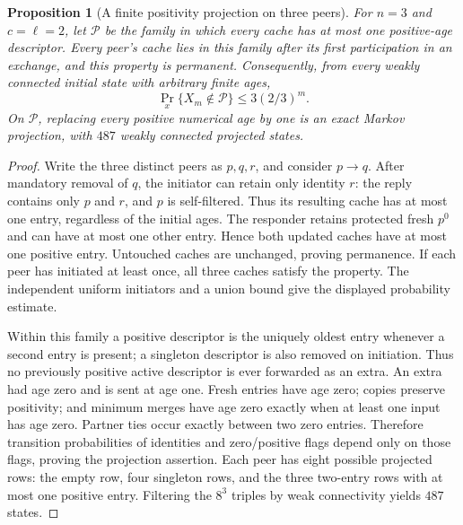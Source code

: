 \documentclass[11pt]{article}
\newtheorem{proposition}[theorem]{Proposition}
\begin{document}
\begin{proposition}[A finite positivity projection on three peers]
\label{prop:c2threepositivity}
For $n=3$ and $c=\ell=2$, let $\mathcal P$ be the family in
which every cache has at most one positive-age descriptor.
Every peer's cache lies in this family after its first
participation in an exchange, and this property is permanent.
Consequently, from every weakly connected initial state with
arbitrary finite ages,
\[
 \Pr_x\{X_m\notin\mathcal P\}\le3(2/3)^m.
\]
On $\mathcal P$, replacing every positive numerical age by one
is an exact Markov projection, with $487$ weakly connected
projected states.
\end{proposition}
\begin{proof}
Write the three distinct peers as $p,q,r$, and consider
$p\to q$. After mandatory removal of $q$, the initiator can
retain only identity $r$: the reply contains only $p$ and $r$,
and $p$ is self-filtered. Thus its resulting cache has at most
one entry, regardless of the initial ages. The responder
retains protected fresh $p^0$ and can have at most one other
entry. Hence both updated caches have at most one positive
entry. Untouched caches are unchanged, proving permanence.
If each peer has initiated at least once, all three caches
satisfy the property. The independent uniform initiators and
a union bound give the displayed probability estimate.

Within this family a positive descriptor is the uniquely
oldest entry whenever a second entry is present; a singleton
descriptor is also removed on initiation. Thus no previously
positive active descriptor is ever forwarded as an extra.
An extra had age zero and is sent at age one. Fresh entries
have age zero; copies preserve positivity; and minimum merges
have age zero exactly when at least one input has age zero.
Partner ties occur exactly between two zero entries.
Therefore transition probabilities of identities and
zero/positive flags depend only on those flags, proving the
projection assertion. Each peer has eight possible projected
rows: the empty row, four singleton rows, and the three
two-entry rows with at most one positive entry. Filtering
the $8^3$ triples by weak connectivity yields $487$ states.
\end{proof}
\end{document}
